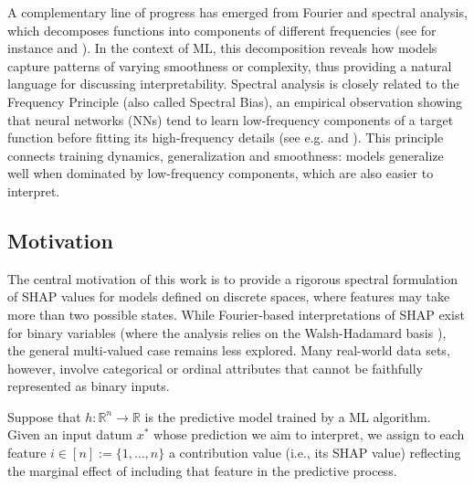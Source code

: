 \documentclass[letterpaper,11pt]{article}
\numberwithin{equation}{section}
\numberwithin{equation}{section}
\begin{document}
A complementary line of progress has emerged from Fourier and spectral analysis, which decomposes functions into components of different frequencies (see for instance \cite{gorji2023scalable} and \cite{cheraghchi2017nearly}). In the context of ML, this decomposition reveals how models capture patterns of varying smoothness or complexity, thus providing a natural language for discussing interpretability. Spectral analysis is closely related to the Frequency Principle (also called Spectral Bias), an empirical observation showing that neural networks (NNs) tend to learn low-frequency components of a target function before fitting its high-frequency details (see e.g. \cite{xu2019frequency} and \cite{rahaman2019spectral}). This principle connects training dynamics, generalization and smoothness: models generalize well when dominated by low-frequency components, which are also easier to interpret. %

\subsection{Motivation}
The central motivation of this work is to provide a rigorous spectral formulation of SHAP values for models defined on discrete spaces, where features may take more than two possible states. While Fourier-based interpretations of SHAP exist for binary variables (where the analysis relies on the Walsh-Hadamard basis \cite{gorji2024shap}), the general multi-valued case remains less explored. Many real-world data sets, however, involve categorical or ordinal attributes that cannot be faithfully represented as binary inputs.%

Suppose that $h:\mathbb{R}^n \to \mathbb{R}$ is the predictive model trained by a ML algorithm. Given an input datum $x^*$ whose prediction we aim to interpret, we assign to each feature $i\in [n]:=\{1,\ldots, n\}$ a contribution value (i.e., its SHAP value) reflecting the marginal effect of including that feature in the predictive process.
\end{document}
